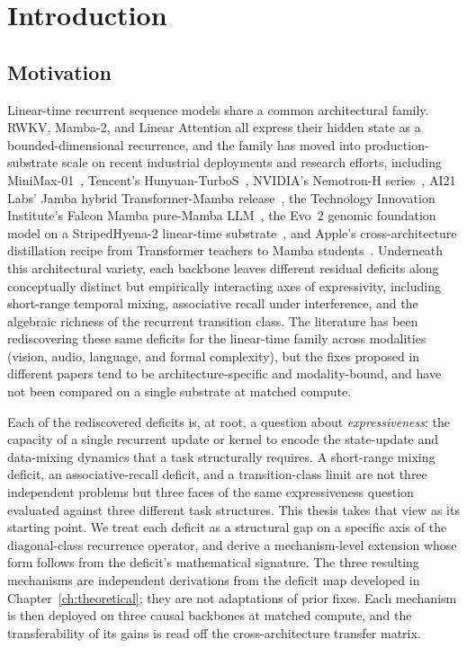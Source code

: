 \chapter{Introduction}\label{ch:introduction}

\section{Motivation}

Linear-time recurrent sequence models share a common architectural
family. RWKV, Mamba-2, and Linear Attention all express their hidden
state as a bounded-dimensional recurrence, and the family has moved
into production-substrate scale on recent industrial deployments
and research efforts, including MiniMax-01~\cite{li2025minimax01},
Tencent's Hunyuan-TurboS~\cite{liu2025hunyuanturbos}, NVIDIA's
Nemotron-H series~\cite{blakeman2025nemotronh}, AI21 Labs' Jamba
hybrid Transformer-Mamba release~\cite{lieber2024jamba}, the
Technology Innovation Institute's Falcon Mamba pure-Mamba
LLM~\cite{zuo2024falconmamba}, the Evo~2 genomic foundation model
on a StripedHyena-2 linear-time substrate~\cite{brixi2026evo2},
and Apple's cross-architecture distillation recipe from
Transformer teachers to Mamba
students~\cite{moudgil2026attentiontomamba}. Underneath this
architectural variety, each backbone leaves different residual
deficits along conceptually distinct but empirically interacting
axes of expressivity, including short-range temporal mixing,
associative recall under interference, and the algebraic richness
of the recurrent transition class. The literature has been
rediscovering these same deficits for the linear-time family
across modalities (vision, audio, language, and formal
complexity), but the fixes proposed in different papers tend to
be architecture-specific and modality-bound, and have not been
compared on a single substrate at matched compute.

Each of the rediscovered deficits is, at root, a question about
\textit{expressiveness}: the capacity of a single recurrent
update or kernel to encode the state-update and data-mixing
dynamics that a task structurally requires. A short-range mixing
deficit, an associative-recall deficit, and a transition-class
limit are not three independent problems but three faces of the
same expressiveness question evaluated against three different
task structures. This thesis takes that view as its starting
point. We treat each deficit as a structural gap on a specific
axis of the diagonal-class recurrence operator, and derive a
mechanism-level extension whose form follows from the deficit's
mathematical signature. The three resulting mechanisms are
independent derivations from the deficit map developed in
Chapter~\ref{ch:theoretical}; they are not adaptations of prior
fixes. Each mechanism is then deployed on three causal backbones
at matched compute, and the transferability of its gains is read
off the cross-architecture transfer matrix.

